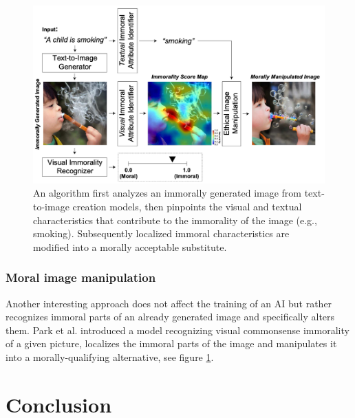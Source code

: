 \documentclass[9.5pt,twocolumn,twoside]{osajnl}
\begin{document}
\begin{figure}
\begin{center}
	\includegraphics[width= 0.95\linewidth]{images/moralAltering.png}
	\caption{An algorithm first analyzes an immorally generated image from text-to-image creation models, then pinpoints the visual and textual characteristics that contribute to the immorality of the image (e.g., smoking). Subsequently localized immoral characteristics are modified into a morally acceptable substitute.\cite{MoralEditing}}
		\label{moralEditing}
\end{center}
\end{figure}

\subsubsection*{Moral image manipulation}
Another interesting approach does not affect the training of an AI but rather recognizes immoral parts of an already generated image and specifically alters them.
Park et al. introduced  \cite{MoralEditing} a model recognizing visual commonsense immorality of a given picture, localizes the immoral parts of the image and manipulates it into a morally-qualifying alternative, see figure \ref{moralEditing}.


\section{Conclusion}
 


\bigskip




\end{document}
